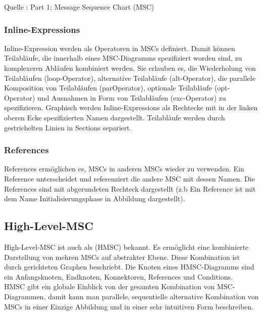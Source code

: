 

Quelle : \cite{MT009}
Part 1: Message Sequence Chart (MSC) 

 

\subsubsection{Inline-Expressions}
Inline-Expression werden als Operatoren in MSCs definiert. Damit können Teilabläufe,
die innerhalb eines MSC-Diagramms spezifiziert worden sind, zu komplexeren Abläufen kombiniert werden. Sie erlauben es, die Wiederholung von Teilabläufen (loop-Operator),
alternative Teilabläufe (alt-Operator), die parallele Komposition von Teilabläufen (parOperator), optionale Teilabläufe (opt-Operator) und Ausnahmen in Form von Teilabläufen (exc-Operator) zu spezifizieren. Graphisch werden Inline-Expressions als Rechtecke mit in der linken oberen Ecke spezifizierten Namen dargestellt. Teilabläufe werden durch gestrichelten Linien in Sections separiert.
\subsubsection{References}
References ermöglichen es, MSCs in anderen MSCs wieder
zu verwenden. 
Ein Reference unterscheidet und referenziert die andere MSC mit dessen Namen. 
Die References sind mit abgerundeten Rechteck dargestellt (z.b Ein Reference ist mit dem Name Initialisierungsphase in Abbildung dargestellt).\\


\subsection{High-Level-MSC}
High-Level-MSC ist auch als (HMSC) bekannt. Es ermöglicht eine kombinierte Darstellung von mehren MSCs auf abstrakter Ebene. Diese Kombination ist durch gerichteten Graphen beschriebt. Die Knoten eines HMSC-Diagramms sind ein Anfangsknoten, Endknoten, Konnektoren, References und Conditions\cite{MT009}.
\\ HMSC gibt ein globale Einblick von der gesamten Kombination von MSC-Diagrammen, damit kann man parallele, sequentielle alternative
Kombination von MSCs in einer Einzige Abbildung und in einer sehr intuitiven Form beschreiben.\\





